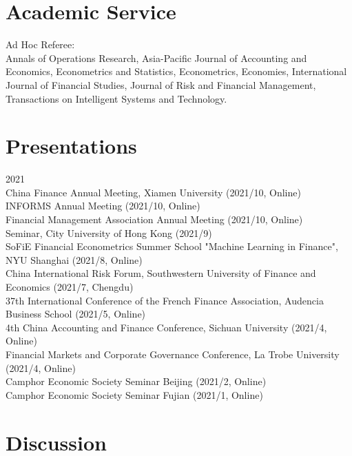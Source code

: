 \documentclass[margin]{res}
\begin{document}
\begin{resume}

\section{\sc Academic Service}

Ad Hoc Referee: \\
Annals of Operations Research,
Asia-Pacific Journal of Accounting and Economics,
Econometrics and Statistics, 
Econometrics,
Economies, 
International Journal of Financial Studies,
Journal of Risk and Financial Management,
Transactions on Intelligent Systems and Technology.

\vspace{5mm}

\section{\sc Presentations}

2021 \\
China Finance Annual Meeting, Xiamen University (2021/10, Online) \\
INFORMS Annual Meeting (2021/10, Online) \\
Financial Management Association Annual Meeting (2021/10, Online) \\
Seminar, City University of Hong Kong (2021/9) \\
SoFiE Financial Econometrics Summer School "Machine Learning in Finance", NYU Shanghai (2021/8, Online) \\
China International Risk Forum, Southwestern University of Finance and Economics  (2021/7, Chengdu) \\
37th International Conference of the French Finance Association, Audencia Business School (2021/5, Online) \\
4th China Accounting and Finance Conference, Sichuan University (2021/4, Online) \\
Financial Markets and Corporate Governance Conference, La Trobe University (2021/4, Online) \\
Camphor Economic Society Seminar Beijing (2021/2, Online) \\
Camphor Economic Society Seminar Fujian (2021/1, Online)\\


\section{\sc Discussion}


\end{resume}
\end{document}
